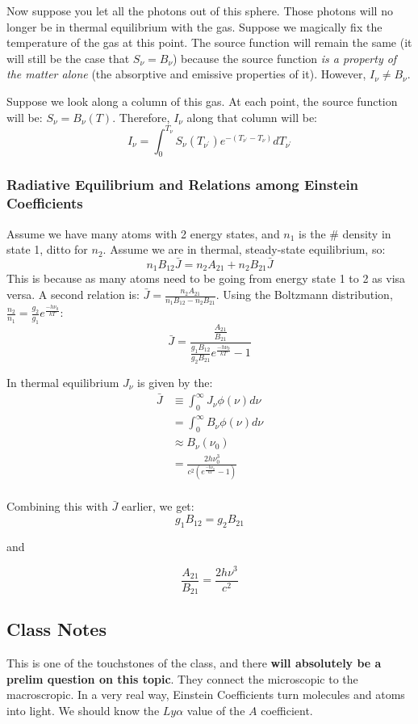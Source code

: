 \documentclass{article}
\def\lya{{Ly\alpha}}
\def\eboltz{e^{\frac{-h\nu _0}{kT}}}
\def\ato{{A_{21}}}
\def\bto{{B_{21}}}
\def\bot{{B_{12}}}
\def\Jbar{{\bar J}}
\def\ato{{A_{21}}}
\def\bto{{B_{21}}}
\def\bot{{B_{12}}}
\def\ato{{A_{21}}}
\def\bto{{B_{21}}}
\def\bot{{B_{12}}}
\begin{document}
Now suppose you let all the photons out of this sphere.  Those photons will
no longer be in thermal equilibrium with the gas.  Suppose we magically fix
the temperature of the gas at this point.  The source function will remain the
same (it will still be the case that $S_\nu = B_\nu$) because the source 
function {\it is a property of the matter alone} (the absorptive and emissive 
properties of it).  However, $I_\nu\ne B_\nu$.\par

Suppose we look along a column of this gas.  At each point, the source
function will be: $S_\nu=B_\nu(T)$.  Therefore, $I_\nu$ along that column
will be: 
\def\np{{\nu^\prime}}
$$I_\nu=\int_0^{T_\nu}{S_\nu(T_\np)e^{-(T_\np-T_\nu)}dT_\np}$$


\subsubsection{ Radiative Equilibrium and Relations among Einstein Coefficients}

Assume we have many atoms with 2 energy states, and $n_1$ is the \# density
in state 1, ditto for $n_2$.  Assume we are in thermal, steady-state 
equilibrium, so:
$$n_1\bot\Jbar=n_2\ato+n_2\bto\Jbar$$
This is because as many atoms need to be
going from energy state 1 to 2 as visa versa.
A second relation is:
$\Jbar = \frac{n_2\ato}{ n_1\bot-n_2\bto}$.
Using the Boltzmann distribution, $\frac{n_2}{ n_1}=\frac{g_2}{ g_1}\eboltz$:
$$\Jbar=\frac{\frac{\ato}{\bto}}{\frac{g_1\bot}{ g_2\bto}\eboltz-1}$$

In thermal equilibrium $J_\nu$ is given by the:
$$\begin{aligned}\Jbar&\equiv\int_0^\infty{J_\nu\phi(\nu)d\nu}\\ 
&=\int_0^\infty{B_\nu\phi(\nu)d\nu}\\ 
&\approx B_\nu(\nu_0)\\ 
&=\frac{2h\nu_0^3}{ c^2(\eboltz-1)}\\ \end{aligned}$$

Combining this with $\Jbar$ earlier, we get:
$$\boxed{g_1\bot=g_2\bto}$$
\centerline{and}
$$\frac{\ato}{\bto}=\frac{2h\nu^3}{c^2}$$

\subsection{Class Notes}

This is one of the touchstones of the class, and there \textbf{will absolutely be a prelim question on this topic}. They connect the microscopic to the macroscropic. In a very real way, Einstein Coefficients turn molecules and atoms into light. We should know the $\lya$ value of the $A$ coefficient. 
\end{document}
